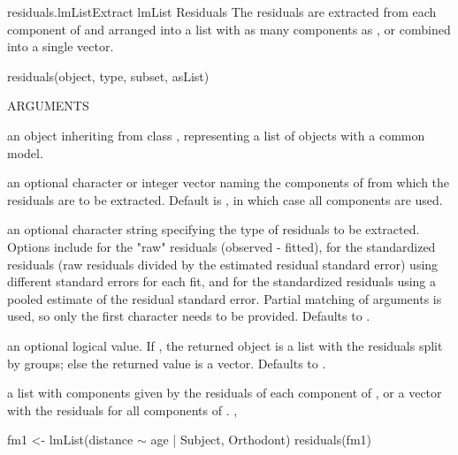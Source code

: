 \documentclass[pdftex]{article} \usepackage{url,graphicx}
\renewcommand{\Twiddle}{\mbox{\(\sim\)}}
\begin{document}
\begin{Helpfile}{residuals.lmList}{Extract lmList Residuals}
The residuals are extracted from each  component of
 and arranged into a list with as many components as
, or combined into a single vector.
\begin{Example}
residuals(object, type, subset, asList)
\end{Example}
\begin{Argument}{ARGUMENTS}
\item[\Co{object:}]
an object inheriting from class , representing
a list of  objects with a common model.
\item[\Co{subset:}]
an optional character or integer vector naming the
 components of  from which the residuals 
are to be extracted. Default is , in which case all
components are used.
\item[\Co{type:}]
an optional character string specifying the type of
residuals to be extracted. Options include  for the
"raw" residuals (observed - fitted),  for the
standardized residuals (raw residuals divided by the estimated
residual standard error) using different standard errors for each
 fit, and  for the standardized
residuals using a pooled estimate of the residual standard
error. Partial matching of arguments is used, so only the first 
character needs to be provided. Defaults to .
\item[\Co{asList:}]
an optional logical value. If , the returned
object is a list with the residuals split by groups; else the
returned value is a vector. Defaults to .
\end{Argument}
a list with components given by the residuals of each 
component of , or a vector with the residuals for all
 components of .
, 
\need 15pt
\vspace{-16pt}
\begin{Example}
fm1 <- lmList(distance {\Twiddle} age | Subject, Orthodont)
residuals(fm1)
\end{Example}
\end{Helpfile}
\end{document}
